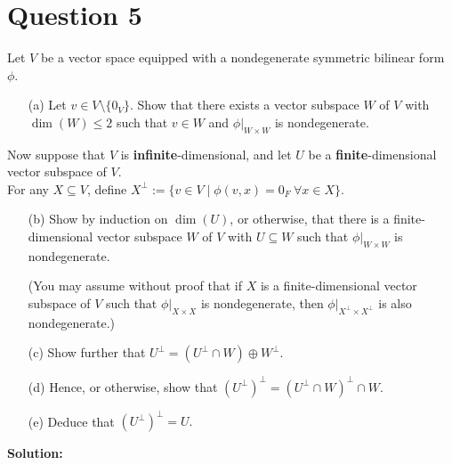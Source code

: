 \documentclass[12pt]{article}
\begin{document}
\section*{Question 5}
Let \( V \) be a vector space equipped with a nondegenerate symmetric bilinear form \( \phi \).

\begin{enumerate}
    \item[(a)] Let \( v \in V \setminus \{ 0_V \} \). Show that there exists a vector subspace \( W \) of \( V \) with \( \dim(W) \leq 2 \) such that \( v \in W \) and \( \phi|_{W \times W} \) is nondegenerate. 
\end{enumerate}
Now suppose that \( V \) is \textbf{infinite}-dimensional, and let \( U \) be a \textbf{finite}-dimensional vector subspace of \( V \). \\
For any \( X \subseteq V \), define \(X^\perp := \{ v \in V \mid \phi(v, x) = 0_F \ \forall x \in X \}.\)
\begin{enumerate} 
    \item[(b)] Show by induction on \( \dim(U) \), or otherwise, that there is a finite-dimensional vector subspace \( W \) of \( V \) with \( U \subseteq W \) such that \( \phi|_{W \times W} \) is nondegenerate. 

    (You may assume without proof that if \( X \) is a finite-dimensional vector subspace of \( V \) such that \( \phi|_{X \times X} \) is nondegenerate, then \( \phi|_{X^\perp \times X^\perp} \) is also nondegenerate.)

    \item[(c)] Show further that \( U^\perp = (U^\perp \cap W) \oplus W^\perp. \)

    \item[(d)] Hence, or otherwise, show that \( (U^\perp)^\perp = (U^\perp \cap W)^\perp \cap W. \)

    \item[(e)] Deduce that \( (U^\perp)^\perp = U. \) 
\end{enumerate}
\noindent \textbf{Solution:} 
\end{document}
